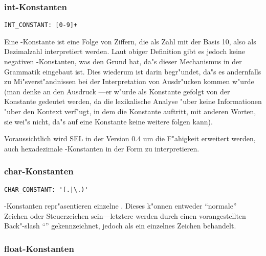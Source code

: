\subsubsection{int-Konstanten}

\begin{verbatim}
INT_CONSTANT: [0-9]+
\end{verbatim}

Eine \tint -Konstante ist eine Folge von Ziffern, die als Zahl
mit der Basis 10, also als Dezimalzahl
interpretiert werden.
Laut obiger Definition gibt es jedoch
keine negativen \tint -Konstanten, was den Grund hat, da"s
dieser Mechanismus in der Grammatik eingebaut ist. Dies wiederum
ist darin begr"undet, da"s es andernfalls zu Mi"sverst"andnissen
bei der Interpretation von Ausdr"ucken kommen w"urde (man denke
an den Ausdruck ---er w"urde als Konstante  gefolgt
von der Konstante  gedeutet werden, da die lexikalische
Analyse "uber keine Informationen "uber den Kontext verf"ugt, in dem
die Konstante auftritt, mit anderen Worten, sie wei"s nicht, da"s
auf eine Konstante keine weitere folgen kann).

Voraussichtlich wird SEL in der Version 0.4 um die F"ahigkeit
erweitert werden, auch hexadezimale
\tint -Konstanten in der Form
 zu interpretieren.

\subsubsection{char-Konstanten}

\begin{verbatim}
CHAR_CONSTANT: '(.|\.)'
\end{verbatim}

\tchar -Konstanten repr"asentieren einzelne .
Dieses k"onnen entweder "`normale"' Zeichen oder
Steuerzeichen
sein---letztere werden durch einen vorangestellten
Back"-slash "`"'
gekennzeichnet, jedoch als ein einzelnes Zeichen behandelt.

\subsubsection{float-Konstanten}

